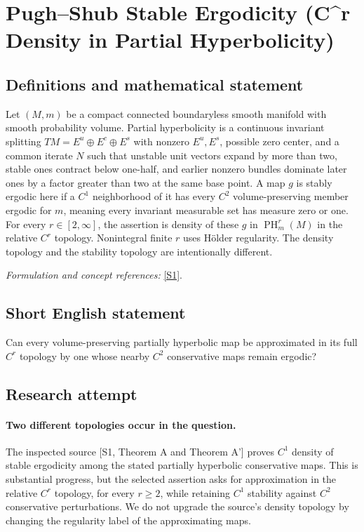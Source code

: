 \documentclass[11pt]{article}
\begin{document}
\section*{\texorpdfstring{Pugh–Shub Stable Ergodicity (C\textasciicircum{}r Density in Partial Hyperbolicity)}{Pugh–Shub Stable Ergodicity (C\textasciicircum{}r Density in Partial Hyperbolicity)}}\label{statement}
\subsection{Definitions and mathematical statement}
Let $(M,m)$ be a compact connected boundaryless smooth manifold with smooth probability volume. Partial hyperbolicity is a continuous invariant splitting $TM=E^u\oplus E^c\oplus E^s$ with nonzero $E^u,E^s$, possible zero center, and a common iterate $N$ such that unstable unit vectors expand by more than two, stable ones contract below one-half, and earlier nonzero bundles dominate later ones by a factor greater than two at the same base point. A map $g$ is stably ergodic here if a $C^1$ neighborhood of it has every $C^2$ volume-preserving member ergodic for $m$, meaning every invariant measurable set has measure zero or one. For every $r\in[2,\infty]$, the assertion is density of these $g$ in $\operatorname{PH}_m^r(M)$ in the relative $C^r$ topology. Nonintegral finite $r$ uses H\"older regularity. The density topology and the stability topology are intentionally different.
\par\smallskip\textit{Formulation and concept references:} \href{https://arxiv.org/pdf/1709.04983}{[S1]}.

\subsection{Short English statement}
Can every volume-preserving partially hyperbolic map be approximated in its full $C^r$ topology by one whose nearby $C^2$ conservative maps remain ergodic?
\subsection{Research attempt}
\paragraph{Two different topologies occur in the question.}
The inspected source [S1, Theorem A and Theorem A'] proves
$C^1$ density of stable ergodicity among the stated partially
hyperbolic conservative maps. This is substantial progress, but
the selected assertion asks for approximation in the relative
$C^r$ topology, for every $r\geq2$, while retaining $C^1$ stability
against $C^2$ conservative perturbations. We do not upgrade the
source's density topology by changing the regularity label of the
approximating maps.
\end{document}
